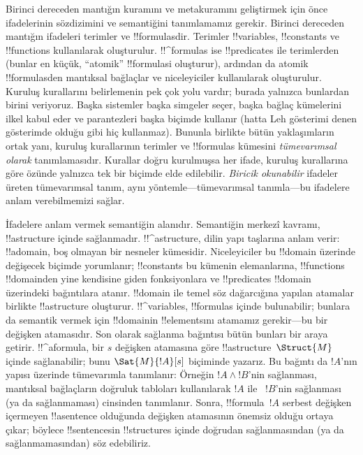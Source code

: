 



Birinci dereceden mantığın kuramını ve metakuramını geliştirmek için önce
ifadelerinin sözdizimini ve semantiğini tanımlamamız gerekir. Birinci dereceden
mantığın ifadeleri terimler ve !!{formula}s{}dir. Terimler !!{variable}s,
!!{constant}s ve !!{function}s kullanılarak oluşturulur. !!^{formula}s ise
!!{predicate}s ile terimlerden (bunlar en küçük, ``atomik'' !!{formula}s{}i
oluşturur), ardından da atomik !!{formula}s{}den mantıksal bağlaçlar ve
niceleyiciler kullanılarak oluşturulur. Kuruluş kurallarını belirlemenin pek
çok yolu vardır; burada yalnızca bunlardan birini veriyoruz. Başka sistemler
başka simgeler seçer, başka bağlaç kümelerini ilkel kabul eder ve parantezleri
başka biçimde kullanır (hatta Leh gösterimi denen gösterimde olduğu gibi hiç
kullanmaz). Bununla birlikte bütün yaklaşımların ortak yanı, kuruluş
kurallarının terimler ve !!{formula}s kümesini \emph{tümevarımsal olarak}
tanımlamasıdır. Kurallar doğru kurulmuşsa her ifade, kuruluş kurallarına göre
özünde yalnızca tek bir biçimde elde edilebilir. \emph{Biricik okunabilir}
ifadeler üreten tümevarımsal tanım, aynı yöntemle---tümevarımsal tanımla---bu
ifadelere anlam verebilmemizi sağlar.

İfadelere anlam vermek semantiğin alanıdır. Semantiğin merkezî kavramı,
!!a{structure} içinde sağlanmadır. !!^a{structure}, dilin yapı taşlarına anlam
verir: !!a{domain}, boş olmayan bir nesneler kümesidir. Niceleyiciler bu
!!{domain} üzerinde değişecek biçimde yorumlanır; !!{constant}s bu kümenin
elemanlarına, !!{function}s !!{domain}{}den yine kendisine giden fonksiyonlara ve
!!{predicate}s !!{domain} üzerindeki bağıntılara atanır. !!{domain} ile temel
söz dağarcığına yapılan atamalar birlikte !!a{structure} oluşturur.
!!^{variable}s, !!{formula}s içinde bulunabilir; bunlara da semantik vermek
için !!{domain}{}in !!{element}s{}ını atamamız gerekir---bu bir değişken
atamasıdır. Son olarak sağlanma bağıntısı bütün bunları bir araya getirir.
!!^a{formula}, bir $s$ değişken atamasına göre !!a{structure}~$\Struct{M}$
içinde sağlanabilir; bunu $\Sat{M}{!A}[s]$ biçiminde yazarız. Bu bağıntı da
$!A$'nın yapısı üzerinde tümevarımla tanımlanır: Örneğin $!A \land !B$'nin
sağlanması, mantıksal bağlaçların doğruluk tabloları kullanılarak $!A$ ile
~$!B$'nin sağlanması (ya da sağlanmaması) cinsinden tanımlanır. Sonra,
!!{formula}~$!A$ serbest değişken içermeyen !!a{sentence} olduğunda değişken
atamasının önemsiz olduğu ortaya çıkar; böylece !!{sentence}s{}in
!!{structure}s içinde doğrudan sağlanmasından (ya da sağlanmamasından) söz
edebiliriz.

